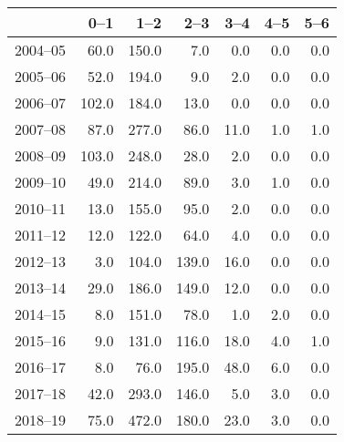 \begin{table}[ht]
\centering
\begin{tabular}{rrrrrrr}
  \hline
 & 0--1 & 1--2 & 2--3 & 3--4 & 4--5 & 5--6 \\ 
  \hline
2004--05 & 60.0 & 150.0 & 7.0 & 0.0 & 0.0 & 0.0 \\ 
  2005--06 & 52.0 & 194.0 & 9.0 & 2.0 & 0.0 & 0.0 \\ 
  2006--07 & 102.0 & 184.0 & 13.0 & 0.0 & 0.0 & 0.0 \\ 
  2007--08 & 87.0 & 277.0 & 86.0 & 11.0 & 1.0 & 1.0 \\ 
  2008--09 & 103.0 & 248.0 & 28.0 & 2.0 & 0.0 & 0.0 \\ 
  2009--10 & 49.0 & 214.0 & 89.0 & 3.0 & 1.0 & 0.0 \\ 
  2010--11 & 13.0 & 155.0 & 95.0 & 2.0 & 0.0 & 0.0 \\ 
  2011--12 & 12.0 & 122.0 & 64.0 & 4.0 & 0.0 & 0.0 \\ 
  2012--13 & 3.0 & 104.0 & 139.0 & 16.0 & 0.0 & 0.0 \\ 
  2013--14 & 29.0 & 186.0 & 149.0 & 12.0 & 0.0 & 0.0 \\ 
  2014--15 & 8.0 & 151.0 & 78.0 & 1.0 & 2.0 & 0.0 \\ 
  2015--16 & 9.0 & 131.0 & 116.0 & 18.0 & 4.0 & 1.0 \\ 
  2016--17 & 8.0 & 76.0 & 195.0 & 48.0 & 6.0 & 0.0 \\ 
  2017--18 & 42.0 & 293.0 & 146.0 & 5.0 & 3.0 & 0.0 \\ 
  2018--19 & 75.0 & 472.0 & 180.0 & 23.0 & 3.0 & 0.0 \\ 
   \hline
\end{tabular}
\end{table}
